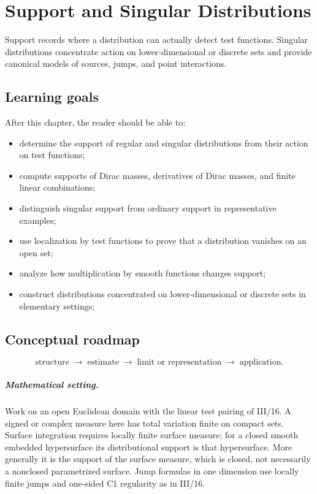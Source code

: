 \chapter{Support and Singular Distributions}
\label{ch:iii17}

Support records where a distribution can actually detect test functions. Singular distributions concentrate action on lower-dimensional or discrete sets and provide canonical models of sources, jumps, and point interactions.

\section*{Learning goals}
After this chapter, the reader should be able to:
\begin{itemize}
\item determine the support of regular and singular distributions from their action on test functions;
\item compute supports of Dirac masses, derivatives of Dirac masses, and finite linear combinations;
\item distinguish singular support from ordinary support in representative examples;
\item use localization by test functions to prove that a distribution vanishes on an open set;
\item analyze how multiplication by smooth functions changes support;
\item construct distributions concentrated on lower-dimensional or discrete sets in elementary settings;
\end{itemize}
\section*{Conceptual roadmap}
\[
\boxed{\text{structure}\;\longrightarrow\;\text{estimate}\;\longrightarrow\;\text{limit or representation}\;\longrightarrow\;\text{application}.}
\]

\paragraph{Mathematical setting.}
Work on an open Euclidean domain with the linear test pairing of III/16. A signed or complex measure here has total variation finite on compact sets. Surface integration requires locally finite surface measure; for a closed smooth embedded hypersurface its distributional support is that hypersurface. More generally it is the support of the surface measure, which is closed, not necessarily a nonclosed parametrized surface. Jump formulas in one dimension use locally finite jumps and one-sided C1 regularity as in III/16.


